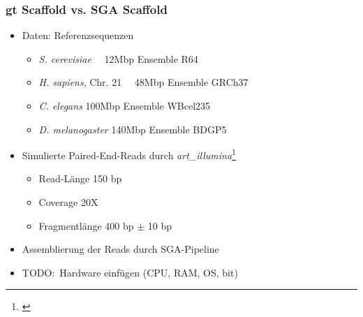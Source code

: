 \documentclass[xcolor=pst]{beamer}
\begin{document}
\begin{frame} %
  \frametitle{gt Scaffold vs. SGA Scaffold}
  \begin{itemize}
    \item Daten: Referenzsequenzen
    \begin{itemize}
      \item \textit{S. cerevisiae}       \tabto{3.5cm}~~12Mbp \tabto{5cm} Ensemble R64
      \item \textit{H. sapiens}, Chr. 21 \tabto{3.5cm}~~48Mbp \tabto{5cm} Ensemble GRCh37
      \item \textit{C. elegans}          \tabto{3.5cm}100Mbp \tabto{5cm} Ensemble WBcel235
      \item \textit{D. melanogaster}     \tabto{3.5cm}140Mbp \tabto{5cm} Ensemble BDGP5
    \end{itemize}
    \item Simulierte Paired-End-Reads durch \textit{art\_illumina}\footnote{\cite{Huang:2012kq}}
    \begin{itemize}
      \item Read-Länge 150 bp
      \item Coverage 20X
      \item Fragmentlänge 400 bp $\pm$ 10 bp
    \end{itemize}
    \item Assemblierung der Reads durch SGA-Pipeline
    \item TODO:\ Hardware einfügen (CPU, RAM, OS, bit)
  \end{itemize}
\end{frame}
\end{document}
